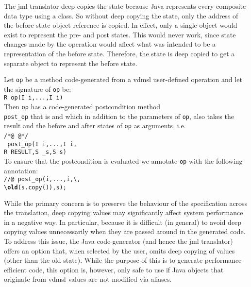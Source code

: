 The \ac{jml} translator deep copies the state because Java represents
every composite data type using a class. So without deep copying the
state, only the address of the before state object reference is
copied. In effect, only a single object would exist to represent the
pre- and post states. This would never work, since state changes made
by the operation would affect what was intended to be a representation
of the before state. Therefore, the state is deep copied to get a
separate object to represent the before state.

 {
  Let \texttt{op} be a method code-generated from a \ac{vdmsl} user-defined operation and let the signature of \texttt{op} be:\\
   \texttt{R op(I i,...,I i)}\\
  Then \texttt{op} has a code-generated postcondition method\\
  \texttt{post\_op} that is  and which in addition to the
  parameters of \texttt{op}, also takes the result and the before and after states of \texttt{op} as arguments, i.e.\ \\
  \texttt{/*@  @*/}  \texttt{ }\\
  \texttt{ post\_op(I i,...,I i,}\\
  \indent \texttt{R RESULT,S \_s,S s)}\\
  To ensure that the postcondition is evaluated we annotate \texttt{op} with the following  annotation:\\
  \texttt{//@ 
    post\_op(i,...,i,\textbackslash{},}\\
  \indent \texttt{\textbackslash\textbf{old}(s.copy()),s);}}
%
%

While the primary concern is to preserve the behaviour of the
specification across the translation, deep copying values may
significantly affect system performance in a negative way. In
particular, because it is difficult (in general) to avoid deep copying
values unnecessarily when they are passed around in the generated
code. To address this issue, the Java code-generator (and hence the
\ac{jml} translator) offers an option that, when selected by the user,
omits deep copying of values (other than the old state). While the
purpose of this is to generate performance-efficient code, this option
is, however, only safe to use if Java objects that originate from
\ac{vdmsl} values are not modified via aliases.

